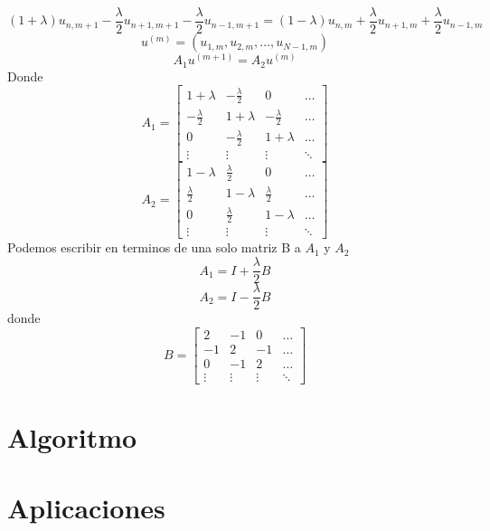 \documentclass[11pt]{article} %
\begin{document}
$$(1+\lambda)u_{n,m+1}-\frac{\lambda}{2}u_{n+1,m+1}-\frac{\lambda}{2}u_{n-1,m+1}=(1-\lambda)u_{n,m}+\frac{\lambda}{2}u_{n+1,m}+\frac{\lambda}{2}u_{n-1,m}$$
$$u^{(m)}=(u_{1,m},u_{2,m},\ldots,u_{N-1,m})$$
$$A_1u^{(m+1)}=A_2u^{(m)}$$
Donde
$$
A_1=
\begin{bmatrix}
  1+\lambda  & -\frac{\lambda}{2} & 0 & \ldots\\ 
 -\frac{\lambda}{2} & 1+\lambda & -\frac{\lambda}{2} & \ldots\\ 
 0 & -\frac{\lambda}{2} & 1+\lambda & \ldots\\ 
 \vdots & \vdots & \vdots & \ddots 
\end{bmatrix}
$$
$$
A_2=
\begin{bmatrix}
 1-\lambda  & \frac{\lambda}{2} & 0 & \ldots\\ 
 \frac{\lambda}{2} & 1-\lambda & \frac{\lambda}{2} & \ldots\\ 
 0 & \frac{\lambda}{2} & 1-\lambda & \ldots\\ 
 \vdots & \vdots & \vdots & \ddots 
\end{bmatrix}
$$
Podemos escribir en terminos de una solo matriz B a $A_1$ y $A_2$
$$
A_1=I+\frac{\lambda}{2}B
$$
$$
A_2=I-\frac{\lambda}{2}B
$$
donde
$$
B=
\begin{bmatrix}
 2  & -1 & 0 & \ldots\\ 
 -1 & 2 & -1 & \ldots\\ 
 0 & -1 & 2 & \ldots\\ 
 \vdots & \vdots & \vdots & \ddots 
\end{bmatrix}
$$



\section*{Algoritmo}


\section*{Aplicaciones}






\end{document}
